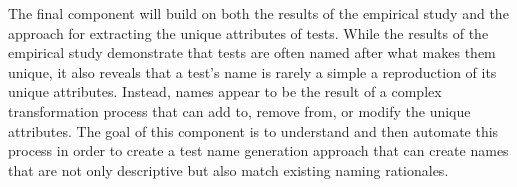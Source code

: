 The final component will build on both the results of the empirical study and the approach for extracting the unique attributes of tests.
%
While the results of the empirical study demonstrate that tests are often named after what makes them unique, it also reveals that a test's name is rarely a simple a reproduction of its unique attributes.
%
Instead, names appear to be the result of a complex transformation process that can add to, remove from, or modify the unique attributes.
%
The goal of this component is to understand and then automate this process in order to create a test name generation approach that can create names that are not only descriptive but also match existing naming rationales.



